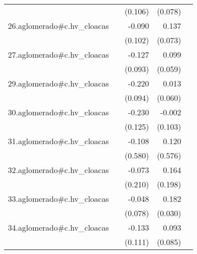 {\begin{longtable}{l*{4}{D{.}{.}{-1}}}
            &                     &     (0.106)         &     (0.078)         &                     \\
\addlinespace
26.aglomerado#c.hv\_cloacas&                     &      -0.090         &       0.137         &                     \\
            &                     &     (0.102)         &     (0.073)         &                     \\
\addlinespace
27.aglomerado#c.hv\_cloacas&                     &      -0.127         &       0.099         &                     \\
            &                     &     (0.093)         &     (0.059)         &                     \\
\addlinespace
29.aglomerado#c.hv\_cloacas&                     &      -0.220\sym{*}  &       0.013         &                     \\
            &                     &     (0.094)         &     (0.060)         &                     \\
\addlinespace
30.aglomerado#c.hv\_cloacas&                     &      -0.230         &      -0.002         &                     \\
            &                     &     (0.125)         &     (0.103)         &                     \\
\addlinespace
31.aglomerado#c.hv\_cloacas&                     &      -0.108         &       0.120         &                     \\
            &                     &     (0.580)         &     (0.576)         &                     \\
\addlinespace
32.aglomerado#c.hv\_cloacas&                     &      -0.073         &       0.164         &                     \\
            &                     &     (0.210)         &     (0.198)         &                     \\
\addlinespace
33.aglomerado#c.hv\_cloacas&                     &      -0.048         &       0.182\sym{***}&                     \\
            &                     &     (0.078)         &     (0.030)         &                     \\
\addlinespace
34.aglomerado#c.hv\_cloacas&                     &      -0.133         &       0.093         &                     \\
            &                     &     (0.111)         &     (0.085)         &                     \\

\end{longtable}}
